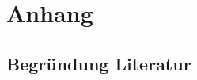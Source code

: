 \section{Anhang}
\label{sec:anhang}

\subsection{Begründung Literatur}
\label{app:BegruendungLiteratur}






